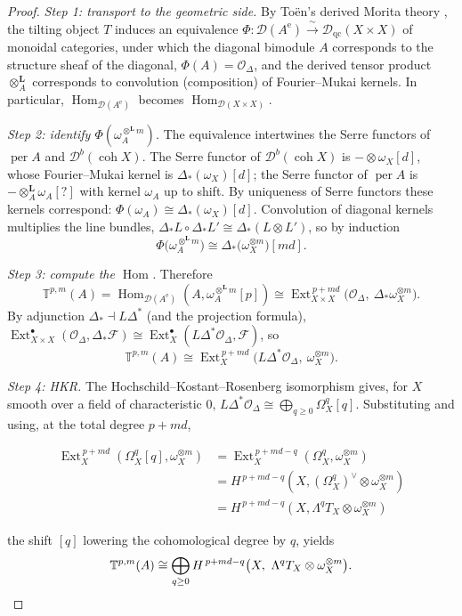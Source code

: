 \documentclass[11pt]{amsart}
\theoremstyle{definition}
\newcommand{\T}{\mathbb{T}}
\newcommand{\Ext}{\operatorname{Ext}}
\newcommand{\Hom}{\operatorname{Hom}}
\newcommand{\Ae}{A^{\mathrm{e}}}
\newcommand{\der}{\mathcal{D}}
\newcommand{\per}{\operatorname{per}}
\newcommand{\Lotimes}{\otimes^{\mathbf{L}}}
\begin{document}
\begin{proof}
\emph{Step 1: transport to the geometric side.} By To\"en's derived Morita
theory \cite{Toen}, the tilting object $T$ induces an equivalence
$\Phi\colon\der(\Ae)\xrightarrow{\ \sim\ }\der_{\mathrm{qc}}(X\times X)$ of
monoidal categories, under which the diagonal bimodule $A$ corresponds to the
structure sheaf of the diagonal, $\Phi(A)=\mathcal O_\Delta$, and the derived
tensor product $\Lotimes_A$ corresponds to convolution (composition) of
Fourier--Mukai kernels. In particular, $\Hom_{\der(\Ae)}$ becomes
$\Hom_{\der(X\times X)}$.

\emph{Step 2: identify $\Phi(\omega_A^{\Lotimes m})$.} The equivalence
intertwines the Serre functors of $\per A$ and $\der^b(\operatorname{coh}X)$.
The Serre functor of $\der^b(\operatorname{coh}X)$ is $-\otimes\omega_X[d]$,
whose Fourier--Mukai kernel is $\Delta_*(\omega_X)[d]$; the Serre functor of
$\per A$ is $-\Lotimes_A\omega_A[?]$ with kernel $\omega_A$ up to shift. By
uniqueness of Serre functors these kernels correspond:
$\Phi(\omega_A)\cong\Delta_*(\omega_X)[d]$. Convolution of diagonal kernels
multiplies the line bundles, $\Delta_*L\circ\Delta_*L'\cong\Delta_*(L\otimes L')$,
so by induction
\[
\Phi\bigl(\omega_A^{\Lotimes m}\bigr)\cong\Delta_*\bigl(\omega_X^{\otimes m}\bigr)[md].
\]

\emph{Step 3: compute the $\Hom$.} Therefore
\[
\T^{p,m}(A)=\Hom_{\der(\Ae)}(A,\omega_A^{\Lotimes m}[p])
\cong\Ext^{\,p+md}_{X\times X}\bigl(\mathcal O_\Delta,\ \Delta_*\omega_X^{\otimes m}\bigr).
\]
By adjunction $\Delta_*\dashv L\Delta^*$ (and the projection formula),
$\Ext^\bullet_{X\times X}(\mathcal O_\Delta,\Delta_*\mathcal F)
\cong\Ext^\bullet_X(L\Delta^*\mathcal O_\Delta,\mathcal F)$, so
\[
\T^{p,m}(A)\cong\Ext^{\,p+md}_X\bigl(L\Delta^*\mathcal O_\Delta,\ \omega_X^{\otimes m}\bigr).
\]

\emph{Step 4: HKR.} The Hochschild--Kostant--Rosenberg isomorphism
\cite{Caldararu,Swan,Yekutieli} gives, for $X$ smooth over a field of
characteristic $0$, $L\Delta^*\mathcal O_\Delta\cong\bigoplus_{q\ge0}\Omega^q_X[q]$.
Substituting and using, at the total degree $p+md$,

\begin{align*}
    \Ext^{\,p+md}_X(\Omega^q_X[q],\omega_X^{\otimes m})
&=\Ext^{\,p+md-q}_X(\Omega^q_X,\omega_X^{\otimes m}) \\
&=H^{\,p+md-q}(X,(\Omega^q_X)^\vee\otimes\omega_X^{\otimes m}) \\
&=H^{\,p+md-q}(X,\Lambda^qT_X\otimes\omega_X^{\otimes m})
\end{align*}

the shift $[q]$ lowering the cohomological degree by $q$, yields
\[
\T^{p,m}(A)\cong\bigoplus_{q\ge0}H^{\,p+md-q}\bigl(X,\ \Lambda^qT_X\otimes\omega_X^{\otimes m}\bigr).\qedhere
\]
\end{proof}
\end{document}
